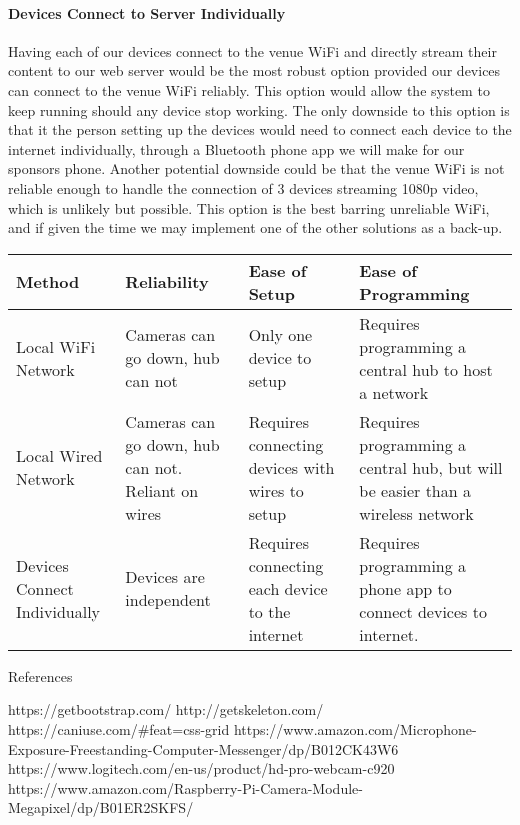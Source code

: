 \documentclass[onecolumn, draftclsnofoot,10pt, compsoc]{IEEEtran}
\begin{document}
            \paragraph{Devices Connect to Server Individually}
            Having each of our devices connect to the venue WiFi and directly stream their content to our web server would be the most robust option provided our devices can connect to the venue WiFi reliably. This option would allow the system to keep running should any device stop working. The only downside to this option is that it the person setting up the devices would need to connect each device to the internet individually, through a Bluetooth phone app we will make for our sponsors phone. Another potential downside could be that the venue WiFi is not reliable enough to handle the connection of 3 devices streaming 1080p video, which is unlikely but possible. This option is the best barring unreliable WiFi, and if given the time we may implement one of the other solutions as a back-up.
            \newline
            \newline
        \begin{tabular}{|l|p{4cm}|p{4cm}|p{4cm}|}
                 \hline
                 Method & Reliability & Ease of Setup & Ease of Programming \\ \hline
                 
                 Local WiFi Network & Cameras can go down, hub can not & Only one device to setup & Requires programming a central hub to host a network\\ \hline
                 
                 Local Wired Network & Cameras can go down, hub can not. Reliant on wires & Requires connecting devices with wires to setup & Requires programming a central hub, but will be easier than a wireless network \\ \hline
                 
                 Devices Connect Individually & Devices are independent & Requires connecting each device to the internet & Requires programming a phone app to connect devices to internet. \\ \hline
            \end{tabular}
            \newline
            \newline
        \begin{louis-techreview-bib}{References}
        
        https://getbootstrap.com/
        http://getskeleton.com/
        https://caniuse.com/#feat=css-grid
        https://www.amazon.com/Microphone-Exposure-Freestanding-Computer-Messenger/dp/B012CK43W6
         https://www.logitech.com/en-us/product/hd-pro-webcam-c920
        https://www.amazon.com/Raspberry-Pi-Camera-Module-Megapixel/dp/B01ER2SKFS/
        
        \end{louis-techreview-bib}
\end{document}
